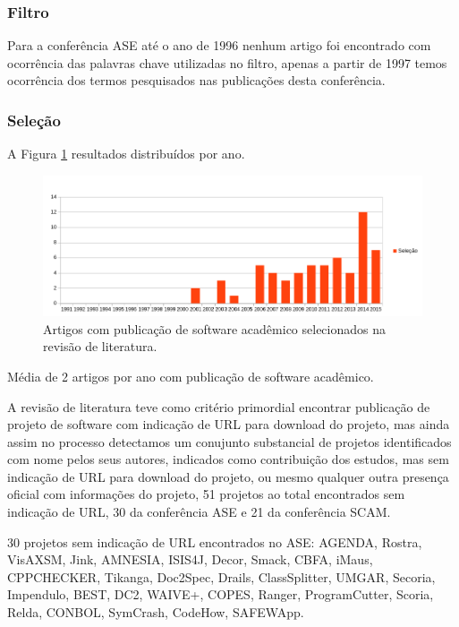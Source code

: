 \subsubsection{Filtro}

Para a conferência ASE até o ano de 1996 nenhum artigo foi encontrado com
ocorrência das palavras chave utilizadas no filtro, apenas a partir de 1997
temos ocorrência dos termos pesquisados nas publicações desta conferência.

\subsubsection{Seleção}

A Figura \ref{artigos-com-software-por-ano} resultados distribuídos por ano.

\begin{figure}[h]
  \center
  \includegraphics[scale=0.65]{imagens/artigos-com-software-por-ano.png}
  \caption{Artigos com publicação de software acadêmico selecionados na revisão de literatura.}
  \label{artigos-com-software-por-ano}
\end{figure}

Média de 2 artigos por ano com publicação de software acadêmico.

A revisão de literatura teve como critério primordial encontrar publicação
de projeto de software com indicação de URL para download do projeto, mas
ainda assim no processo detectamos um conujunto substancial de projetos
identificados com nome pelos seus autores, indicados como contribuição dos
estudos, mas sem indicação de URL para download do projeto, ou mesmo qualquer
outra presença oficial com informações do projeto, 51 projetos ao total
encontrados sem indicação de URL, 30 da conferência ASE e 21 da conferência SCAM.

30 projetos sem indicação de URL encontrados no ASE:
AGENDA, Rostra, VisAXSM, Jink, AMNESIA, ISIS4J, Decor, Smack, CBFA, iMaus,
CPPCHECKER, Tikanga, Doc2Spec, Drails, ClassSplitter, UMGAR, Secoria,
Impendulo, BEST, DC2, WAIVE+, COPES, Ranger, ProgramCutter, Scoria, Relda,
CONBOL, SymCrash, CodeHow, SAFEWApp.

